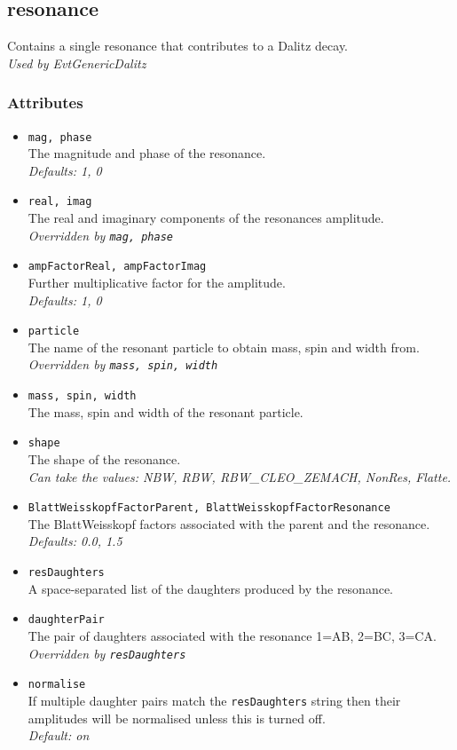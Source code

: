 \subsection{resonance}
Contains a single resonance that contributes to a Dalitz decay.\\
\emph{Used by EvtGenericDalitz}
\subsubsection*{Attributes}
\begin{itemize}
\item{\tt mag, phase}\\
      The magnitude and phase of the resonance.\\
      \emph{Defaults: 1, 0}
\item{\tt real, imag}\\
      The real and imaginary components of the resonances amplitude.\\
      \emph{Overridden by \tt mag, phase}
\item{\tt ampFactorReal, ampFactorImag}\\
      Further multiplicative factor for the amplitude.\\
      \emph{Defaults: 1, 0}
\item{\tt particle}\\
      The name of the resonant particle to obtain mass, spin and width from.\\
      \emph{Overridden by \tt mass, spin, width}
\item{\tt mass, spin, width}\\
      The mass, spin and width of the resonant particle.
\item{\tt shape}\\
      The shape of the resonance.\\
      \emph{Can take the values: NBW, RBW, RBW\_CLEO\_ZEMACH, NonRes, Flatte.}
\item{\tt BlattWeisskopfFactorParent, BlattWeisskopfFactorResonance}\\
      The BlattWeisskopf factors associated with the parent and the resonance.\\
      \emph{Defaults: 0.0, 1.5}
\item{\tt resDaughters}\\
      A space-separated list of the daughters produced by the resonance.
\item{\tt daughterPair}\\
      The pair of daughters associated with the resonance 1=AB, 2=BC, 3=CA.\\
      \emph{Overridden by \tt resDaughters}
\item{\tt normalise}\\
      If multiple daughter pairs match the {\tt resDaughters} string then their amplitudes will be normalised unless this is turned off.\\
      \emph{Default: on}
\end{itemize}
